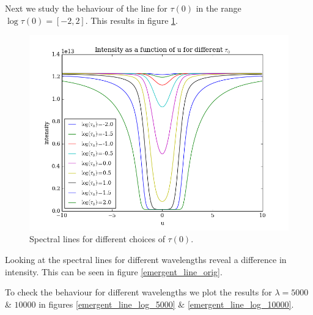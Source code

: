 \documentclass{aa}   %
\begin{document}
Next we study the behaviour of the line for $\tau(0)$ in the range $\log \tau(0) = [-2, 2]$.
This results in figure \ref{emergent_line_log_2000}.
\begin{figure}
 \includegraphics[width=.49\textwidth]{emergent_line_log_2000.png}
 \caption{Spectral lines for different choices of $\tau(0)$.}
 \label{emergent_line_log_2000} 
\end{figure}
Looking at the spectral lines for different wavelengths reveal a difference in intensity. This can be seen in figure \ref{emergent_line_orig}.

To check the behaviour for different wavelengths we plot the results for $\lambda = 5000$ \& $10000$ in figures  \ref{emergent_line_log_5000} $\&$ \ref{emergent_line_log_10000}.
\end{document}
